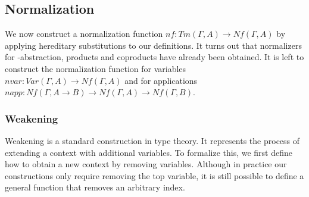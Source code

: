 \subsection{Normalization}

We now construct a normalization function $nf : Tm(\Gamma,A) \to Nf(\Gamma,A)$ by applying hereditary substitutions to our definitions. It turns out that normalizers for \lambda-abstraction, products and coproducts have already been obtained. It is left to construct the normalization function for variables $nvar : Var(\Gamma,A) \to Nf(\Gamma,A)$ and for applications $napp : Nf(\Gamma,A \to B) \to Nf(\Gamma,A) \to Nf(\Gamma,B)$.

\subsubsection*{Weakening}

Weakening is a standard construction in type theory. It represents the process of extending a context with additional variables. To formalize this, we first define how to obtain a new context by removing variables. Although in practice our constructions only require removing the top variable, it is still possible to define a general function that removes an arbitrary index.

\begin{code}[hide]%
\>[0]\AgdaOperator{\AgdaFunction{\AgdaUnderscore{}-\AgdaUnderscore{}}}\AgdaSpace{}%
\AgdaSymbol{:}\AgdaSpace{}%
\AgdaSymbol{(}\AgdaSpace{}%
\AgdaSymbol{:}\AgdaSpace{}%
\AgdaSymbol{)}\AgdaSpace{}%
\AgdaSpace{}%
\AgdaSpace{}%
\AgdaSpace{}%
\AgdaSpace{}%
\AgdaSpace{}%
\<%
\\
\>[0]\AgdaSymbol{(}\AgdaSpace{}%
\AgdaSpace{}%
\AgdaSymbol{)}\AgdaSpace{}%
\AgdaOperator{\AgdaFunction{-}}\AgdaSpace{}%
\AgdaSpace{}%
\AgdaSymbol{=}\AgdaSpace{}%
\<%
\\
\>[0]\AgdaSymbol{(}\AgdaSpace{}%
\AgdaSpace{}%
\AgdaSymbol{)}\AgdaSpace{}%
\AgdaOperator{\AgdaFunction{-}}\AgdaSpace{}%
\AgdaSymbol{(}\AgdaSpace{}%
\AgdaSymbol{)}\AgdaSpace{}%
\AgdaSymbol{=}\AgdaSpace{}%
\AgdaSymbol{(}\AgdaSpace{}%
\AgdaOperator{\AgdaFunction{-}}\AgdaSpace{}%
\AgdaSymbol{)}\AgdaSpace{}%
\AgdaSpace{}%
\<%
\end{code}

